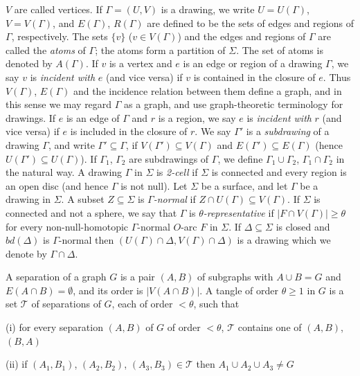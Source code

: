 \noindent $V$ are called vertices. If $\Gamma = (U, V)$ is a drawing, we write $U = U(\Gamma)$, $V = V(\Gamma)$, and $E(\Gamma)$, $R(\Gamma)$ are defined to be the sets of edges and regions of $\Gamma$, respectively. The sets $\{v\}$ ($v \in V(\Gamma)$) and the edges and regions of $\Gamma$ are called the \textit{atoms} of $\Gamma$; the atoms form a partition of $\Sigma$. The set of atoms is denoted by $A(\Gamma)$. If $v$ is a vertex and $e$ is an edge or region of a drawing $\Gamma$, we say $v$ is \textit{incident with} $e$ (and vice versa) if $v$ is contained in the closure of $e$. Thus $V(\Gamma)$, $E(\Gamma)$ and the incidence relation between them define a graph, and in this sense we may regard $\Gamma$ as a graph, and use graph-theoretic terminology for drawings. If $e$ is an edge of $\Gamma$ and $r$ is a region, we say $e$ is \textit{incident with} $r$ (and vice versa) if $e$ is included in the closure of $r$. We say $\Gamma'$ is a \textit{subdrawing} of a drawing $\Gamma$, and write $\Gamma' \subseteq \Gamma$, if $V(\Gamma') \subseteq V(\Gamma)$ and $E(\Gamma') \subseteq E(\Gamma)$ (hence $U(\Gamma') \subseteq U(\Gamma)$). If $\Gamma_1$, $\Gamma_2$ are subdrawings of $\Gamma$, we define $\Gamma_1 \cup \Gamma_2$, $\Gamma_1 \cap \Gamma_2$ in the natural way. A drawing $\Gamma$ in $\Sigma$ is \textit{2-cell} if $\Sigma$ is connected and every region is an open disc (and hence $\Gamma$ is not null). Let $\Sigma$ be a surface, and let $\Gamma$ be a drawing in $\Sigma$. A subset $Z \subseteq \Sigma$ is \textit{$\Gamma$-normal} if $Z \cap U(\Gamma) \subseteq V(\Gamma)$. If $\Sigma$ is connected and not a sphere, we say that $\Gamma$ is \textit{$\theta$-representative} if $|F \cap V(\Gamma)| \ge \theta$ for every non-null-homotopic $\Gamma$-normal $O$-arc $F$ in $\Sigma$. If $\Delta \subseteq \Sigma$ is closed and $bd(\Delta)$ is $\Gamma$-normal then $(U(\Gamma) \cap \Delta, V(\Gamma) \cap \Delta)$ is a drawing which we denote by $\Gamma \cap \Delta$.

A separation of a graph $G$ is a pair $(A, B)$ of subgraphs with $A \cup B = G$ and $E(A \cap B) = \emptyset$, and its order is $|V(A \cap B)|$. A tangle of order $\theta \ge 1$ in $G$ is a set $\mathscr{T}$ of separations of $G$, each of order $<\theta$, such that

\hspace*{12pt}(i) for every separation $(A, B)$ of $G$ of order $<\theta$, $\mathscr{T}$ contains one of $(A, B)$, $(B, A)$

\hspace*{12pt}(ii) if $(A_1, B_1)$, $(A_2, B_2)$, $(A_3, B_3) \in \mathscr{T}$ then $A_1 \cup A_2 \cup A_3 \ne G$

